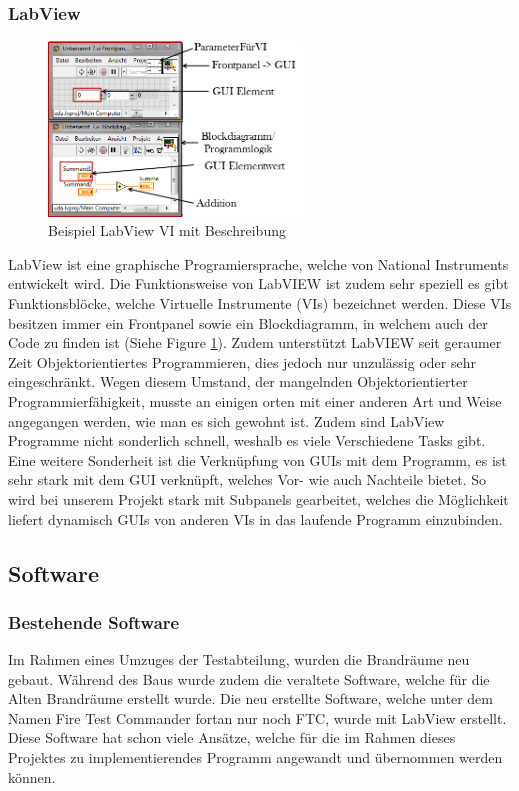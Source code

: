 \documentclass[10pt]{scrartcl}
\begin{document}
\subsubsection{LabView}
\begin{figure}
	\begin{center}
		\includegraphics[width=0.6\textwidth]{LabVIEWExample}
		\caption{Beispiel LabView VI mit Beschreibung}
		\label{fig:LabViewExample}
	\end{center}
\end{figure}
LabView ist eine graphische Programiersprache, welche von National Instruments entwickelt wird. Die Funktionsweise von LabVIEW ist zudem sehr speziell es gibt Funktionsblöcke, welche Virtuelle Instrumente (VIs) bezeichnet werden. Diese VIs besitzen immer ein Frontpanel sowie ein Blockdiagramm, in welchem auch der Code zu finden ist (Siehe Figure \ref{fig:LabViewExample}). Zudem unterstützt LabVIEW seit geraumer Zeit Objektorientiertes Programmieren, dies jedoch nur unzulässig oder sehr eingeschränkt.
\newline
Wegen diesem Umstand, der mangelnden Objektorientierter Programmierfähigkeit, musste an einigen orten mit einer anderen Art und Weise angegangen werden, wie man es sich gewohnt ist. Zudem sind LabView Programme nicht sonderlich schnell, weshalb es viele Verschiedene Tasks gibt.
\newline
Eine weitere Sonderheit ist die Verknüpfung von GUIs mit dem Programm, es ist sehr stark mit dem GUI verknüpft, welches Vor- wie auch Nachteile bietet. So wird bei unserem Projekt stark mit Subpanels gearbeitet, welches die Möglichkeit liefert dynamisch GUIs von anderen VIs in das laufende Programm einzubinden.


\subsection{Software}
\subsubsection{Bestehende Software}
Im Rahmen eines Umzuges der Testabteilung, wurden die Brandräume neu gebaut. Während des Baus wurde zudem die veraltete Software, welche für die Alten Brandräume erstellt wurde. Die neu erstellte Software, welche unter dem Namen Fire Test Commander fortan nur noch FTC, wurde mit LabView erstellt. Diese Software hat schon viele Ansätze, welche für die im Rahmen dieses Projektes zu implementierendes Programm angewandt und übernommen werden können.
\end{document}
